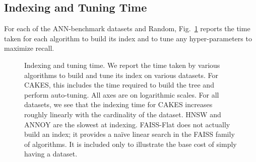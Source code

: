 

\subsection{Indexing and Tuning Time}
\label{sec:results:indexing-and-tuning-time}

For each of the ANN-benchmark datasets and Random, Fig.~\ref{fig:results:indexing} reports the time taken for each algorithm to build its index and to tune any hyper-parameters to maximize recall.

\begin{figure}[h]
  \centering
  \vskip -0.2in

  \vskip -0.1in
  \caption{Indexing and tuning time.
  We report the time taken by various algorithms to build and tune its index on various datasets.
  For CAKES, this includes the time required to build  the tree and perform auto-tuning.
  All axes are on logarithmic scales.
  For all datasets, we see that the indexing time for CAKES increases roughly linearly with the cardinality of the dataset.
  HNSW and ANNOY are the slowest at indexing.
  FAISS-Flat does not actually build an index;
  it provides a na\"{i}ve linear search in the FAISS family of algorithms.
  It is included only to illustrate the base cost of simply having a dataset.}
  \label{fig:results:indexing}
\end{figure}

